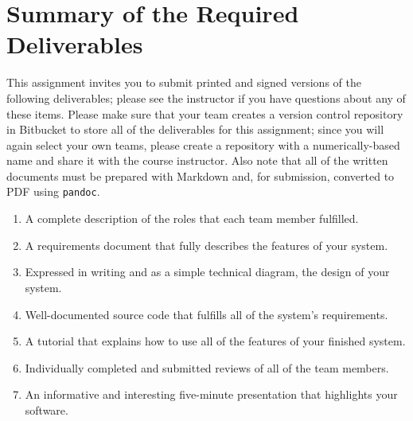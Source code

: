 \section*{Summary of the Required Deliverables}

This assignment invites you to submit printed and signed versions of the following deliverables; please see the
instructor if you have questions about any of these items. Please make sure that your team creates a version control
repository in Bitbucket to store all of the deliverables for this assignment; since you will again select your own
teams, please create a repository with a numerically-based name and share it with the course instructor. Also note that
all of the written documents must be prepared with Markdown and, for submission, converted to PDF using {\tt pandoc}.

\vspace*{-.1in}
\begin{enumerate}
  \setlength{\itemsep}{0in}
  \item A complete description of the roles that each team member fulfilled.
  \item A requirements document that fully describes the features of your system.
  \item Expressed in writing and as a simple technical diagram, the design of your system.
  \item Well-documented source code that fulfills all of the system's requirements.
  \item A tutorial that explains how to use all of the features of your finished system.
  \item Individually completed and submitted reviews of all of the team members.
  \item An informative and interesting five-minute presentation that highlights your software.
\end{enumerate}
\vspace*{-.1in}



